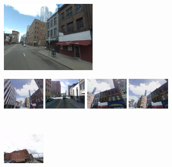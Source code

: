 \documentclass[table]{article} %
\begin{document}
\begin{figure}[t!]
\begin{minipage}{0.75\linewidth}
\begin{minipage}{\linewidth}
            \end{minipage} 
        \end{minipage}
        \vspace{3mm}
        \\
        \begin{minipage}{0.34\linewidth}
            \centering
            \vspace{0mm}
            \includegraphics[height=36mm]{imgs/ex4/query}
        \end{minipage}
        \begin{minipage}{0.75\linewidth}
            \begin{minipage}{\linewidth} 
                \colorbox{myGreen}{\includegraphics[height=16mm]{imgs/ex4/FVsvm1}}
                \colorbox{myRed}{\includegraphics[height=16mm]{imgs/ex4/FVsvm2}}
                \colorbox{myGreen}{\includegraphics[height=16mm]{imgs/ex4/FVsvm5}}
                \colorbox{myGreen}{\includegraphics[height=16mm]{imgs/ex4/FVsvm4}}
            \end{minipage}
            \\
            \begin{minipage}{\linewidth}
                \colorbox{myRed}{\includegraphics[height=16mm]{imgs/ex4/FV1}}

\end{minipage}
\end{minipage}
\end{figure}
\end{document}
